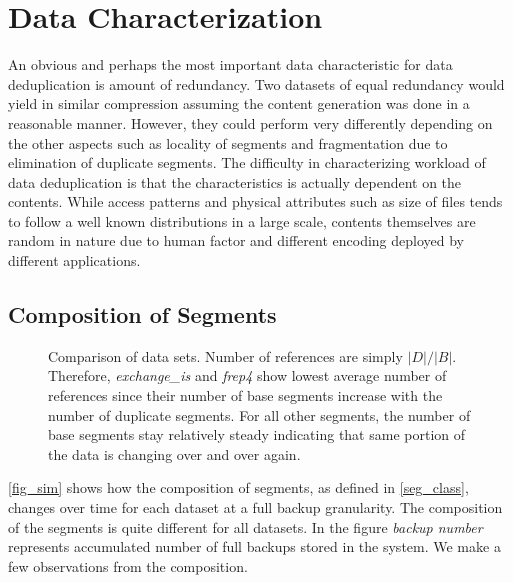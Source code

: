 \section{Data Characterization}\label{result}

An obvious and perhaps the most important data characteristic for data deduplication is amount of redundancy. Two datasets of equal redundancy would yield in similar compression assuming the content generation was done in a reasonable manner. However, they could perform very differently depending on the other aspects such as locality of segments and fragmentation due to elimination of duplicate segments. The difficulty in characterizing workload of data deduplication is that the characteristics is actually dependent on the contents. While access patterns and physical attributes such as size of files tends to follow a well known distributions in a large scale\cite{Riska:2009:EDW:1639562.1639589, Leung:2008:MAL:1404014.1404030}, contents themselves are random in nature due to human factor and different encoding deployed by different applications.

\subsection {Composition of Segments}

\begin{figure*}[!t]
\centerline{
\hfil
{}
\hfil
{}}
\caption{Comparison of data sets. Number of references are simply $|D|/|B|$. Therefore, \emph{exchange\_is} and \emph{frep4} show lowest average number of references since their number of base segments increase with the number of duplicate segments. For all other segments, the number of base segments stay relatively steady indicating that same portion of the data is changing over and over again.}
\label{data_comp}
\end{figure*}

\figurename \ref{fig_sim} shows how the composition of segments, as defined in \figurename \ref{seg_class}, changes over time for each dataset at a full backup granularity.  The composition of the segments is quite different for all datasets. In the figure \emph{backup number} represents accumulated number of full backups stored in the system. We make a few observations from the composition.

